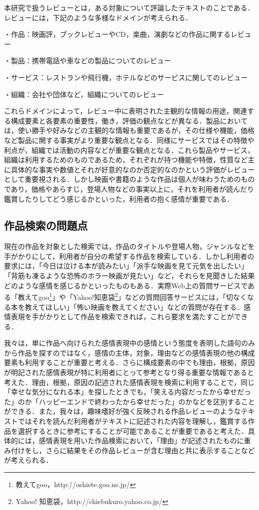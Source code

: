 \documentclass[japanese]{jnlp_1.3a}
\begin{document}
本研究で扱うレビューとは，ある対象について評論したテキストのことである．レビューには，下記のような多様なドメインが考えられる．

・作品：映画評，ブックレビューやCD，楽曲，演劇などの作品に関するレビュー

・製品：携帯電話や車などの製品についてのレビュー

・サービス：レストランや飛行機，ホテルなどのサービスに関してのレビュー

・組織：会社や団体など，組織についてのレビュー

これらドメインによって，レビュー中に表明された主観的な情報の用途，関連する構成要素と各要素の重要性，働き，評価の観点などが異なる．製品においては，使い勝手や好みなどの主観的な情報も重要であるが，その仕様や機能，価格など製品に関する事実がより重要な観点となる．同様にサービスではその特徴や利点が，組織では活動の内容などが重要な観点となる．これら製品やサービス，組織は利用するためのものであるため，それぞれが持つ機能や特徴，性質など主に具体的な事実や数値とそれが好意的なのか否定的なのかという評価がレビューとして重要視される．しかし映画や書籍のような作品は個人が味わうためのものであり，価格やあらすじ，登場人物などの事実以上に，それを利用者が読んだり鑑賞したりしてどう感じるかといった，利用者の抱く感情が重要である．

\subsection{作品検索の問題点}

現在の作品を対象とした検索では，作品のタイトルや登場人物，ジャンルなどを手がかりにして，利用者が自分の希望する作品を検索している．しかし利用者の要求には，「今日は泣ける本が読みたい」「派手な映画を見て元気を出したい」「背筋も凍るような恐怖のホラー映画が見たい」など，それらを見聞きした結果どのような感情を感じるかといったものもある．実際Web上の質問サービスである「教えてgoo\footnote{
	教えてgoo，http://oshiete.goo.ne.jp/}」や「Yahoo!知恵袋\footnote{
	Yahoo! 知恵袋，http://chiebukuro.yahoo.co.jp/}」などの質問回答サービスには，「切なくなる本を教えてほしい」「怖い映画を教えてください」などの質問が存在する．感情表現を手がかりとして作品を検索できれば，これら要求を満たすことができる．

我々は，単に作品へ向けられた感情表現中の感情という態度を表明した語句のみから作品を探すのではなく，感情の主体，対象，理由などの感情表現の他の構成要素も利用することが重要と考える．さらに構成要素の中でも理由，根拠，原因が明記された感情表現が特に利用者にとって参考となり得る重要な情報であると考えた．理由，根拠，原因の記述された感情表現を検索に利用することで，同じ「幸せな気分になれる本」を探したときでも，「笑える内容だったから幸せだった」のか「ハッピーエンドで終わったから幸せだった」のかなどを区別することができる．また，我々は，趣味嗜好が強く反映される作品レビューのようなテキストではそれを読んだ利用者がテキストに記述された内容を理解し，鑑賞する作品を選択するときに参考にすることが可能であることが重要であると考えた．具体的には，感情表現を用いた作品検索において，「理由」が記述されたものに重み付けをし，さらに結果をその作品レビューが含む理由と共に表示することなどが考えられる． 
\end{document}
